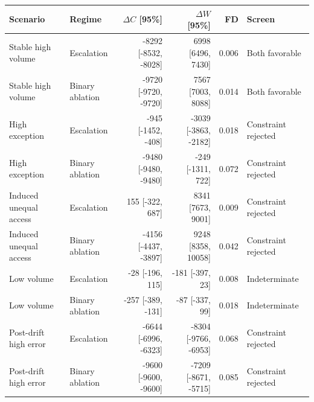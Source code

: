 \begin{tabular}{@{}llrrrl@{}}
\toprule
Scenario & Regime & $\Delta C$ [95\%] & $\Delta W$ [95\%] & FD & Screen \\
\midrule
Stable high volume & Escalation & -8292 [-8532, -8028] & 6998 [6496, 7430] & 0.006 & Both favorable \\
Stable high volume & Binary ablation & -9720 [-9720, -9720] & 7567 [7003, 8088] & 0.014 & Both favorable \\
High exception & Escalation & -945 [-1452, -408] & -3039 [-3863, -2182] & 0.018 & Constraint rejected \\
High exception & Binary ablation & -9480 [-9480, -9480] & -249 [-1311, 722] & 0.072 & Constraint rejected \\
Induced unequal access & Escalation & 155 [-322, 687] & 8341 [7673, 9001] & 0.009 & Constraint rejected \\
Induced unequal access & Binary ablation & -4156 [-4437, -3897] & 9248 [8358, 10058] & 0.042 & Constraint rejected \\
Low volume & Escalation & -28 [-196, 115] & -181 [-397, 23] & 0.008 & Indeterminate \\
Low volume & Binary ablation & -257 [-389, -131] & -87 [-337, 99] & 0.018 & Indeterminate \\
Post-drift high error & Escalation & -6644 [-6996, -6323] & -8304 [-9766, -6953] & 0.068 & Constraint rejected \\
Post-drift high error & Binary ablation & -9600 [-9600, -9600] & -7209 [-8671, -5715] & 0.085 & Constraint rejected \\
\bottomrule
\end{tabular}
